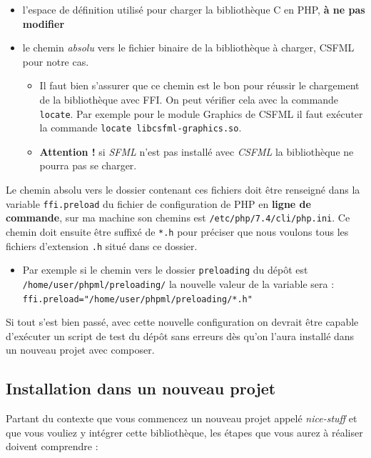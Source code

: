 \documentclass[11pt,a4paper,krantz2,11pt,oneside]{krantz}
\providecommand{\tightlist}{%
  \setlength{\itemsep}{0pt}\setlength{\parskip}{0pt}}
\begin{document}
\begin{itemize}
\tightlist
\item
  l'espace de définition utilisé pour charger la bibliothèque C en PHP, \textbf{à ne pas modifier}
\item
  le chemin \emph{absolu} vers le fichier binaire de la bibliothèque à charger, CSFML pour notre cas.

  \begin{itemize}
  \tightlist
  \item
    Il faut bien s'assurer que ce chemin est le bon pour réussir le chargement de la bibliothèque avec FFI. On peut vérifier cela avec la commande \texttt{locate}. Par exemple pour le module Graphics de CSFML il faut exécuter la commande \texttt{locate\ libcsfml-graphics.so}.
  \item
    \textbf{Attention !} si \emph{SFML} n'est pas installé avec \emph{CSFML} la bibliothèque ne pourra pas se charger.
  \end{itemize}
\end{itemize}

Le chemin absolu vers le dossier contenant ces fichiers doit être renseigné dans la variable \texttt{ffi.preload} du fichier de configuration de PHP en \textbf{ligne de commande}, sur ma machine son chemins est \texttt{/etc/php/7.4/cli/php.ini}. Ce chemin doit ensuite être suffixé de \texttt{*.h} pour préciser que nous voulons tous les fichiers d'extension \texttt{.h} situé dans ce dossier.

\begin{itemize}
\tightlist
\item
  Par exemple si le chemin vers le dossier \texttt{preloading} du dépôt est \texttt{/home/user/phpml/preloading/} la nouvelle valeur de la variable sera : \texttt{ffi.preload="/home/user/phpml/preloading/*.h"}
\end{itemize}

Si tout s'est bien passé, avec cette nouvelle configuration on devrait être capable d'exécuter un script de test du dépôt sans erreurs dès qu'on l'aura installé dans un nouveau projet avec composer.

\hypertarget{installation-dans-un-nouveau-projet}{%
\subsection{Installation dans un nouveau projet}\label{installation-dans-un-nouveau-projet}}

Partant du contexte que vous commencez un nouveau projet appelé \emph{nice-stuff} et que vous vouliez y intégrer cette bibliothèque, les étapes que vous aurez à réaliser doivent comprendre :
\end{document}
